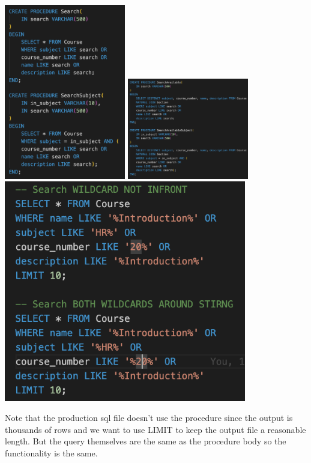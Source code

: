 \documentclass[12pt, a4paper]{article}
\begin{document}
\begin{center}
    \includegraphics[width=200px]{images/R7/pq1}
    \includegraphics[width=200px]{images/R7/pq2}
    \includegraphics[width=400px]{images/R7/wildcard}
\end{center}

Note that the production sql file doesn't use the procedure since the output is thousands of rows and we want to use LIMIT to keep the output file a reasonable length. But the query themselves are the same as the procedure body so the functionality is the same.
\end{document}
